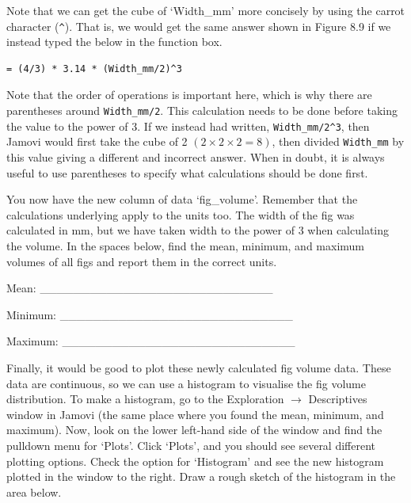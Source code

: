 \documentclass[
]{scrbook}
\begin{document}
Note that we can get the cube of `Width\_mm' more concisely by using the carrot character (\texttt{\^{}}).
That is, we would get the same answer shown in Figure 8.9 if we instead typed the below in the function box.

\begin{verbatim}
= (4/3) * 3.14 * (Width_mm/2)^3
\end{verbatim}

Note that the order of operations is important here, which is why there are parentheses around \texttt{Width\_mm/2}. This calculation needs to be done before taking the value to the power of 3. If we instead had written, \texttt{Width\_mm/2\^{}3}, then Jamovi would first take the cube of 2 \((2 \times 2 \times 2 = 8)\), then divided \texttt{Width\_mm} by this value giving a different and incorrect answer. When in doubt, it is always useful to use parentheses to specify what calculations should be done first.

You now have the new column of data `fig\_volume'.
Remember that the calculations underlying apply to the units too.
The width of the fig was calculated in mm, but we have taken width to the power of 3 when calculating the volume.
In the spaces below, find the mean, minimum, and maximum volumes of all figs and report them in the correct units.

Mean: \_\_\_\_\_\_\_\_\_\_\_\_\_\_\_\_\_\_\_\_\_\_\_\_\_\_\_\_

Minimum: \_\_\_\_\_\_\_\_\_\_\_\_\_\_\_\_\_\_\_\_\_\_\_\_\_\_\_\_

Maximum: \_\_\_\_\_\_\_\_\_\_\_\_\_\_\_\_\_\_\_\_\_\_\_\_\_\_\_\_

Finally, it would be good to plot these newly calculated fig volume data.
These data are continuous, so we can use a histogram to visualise the fig volume distribution.
To make a histogram, go to the Exploration \(\to\) Descriptives window in Jamovi (the same place where you found the mean, minimum, and maximum).
Now, look on the lower left-hand side of the window and find the pulldown menu for `Plots'.
Click `Plots', and you should see several different plotting options.
Check the option for `Histogram' and see the new histogram plotted in the window to the right.
Draw a rough sketch of the histogram in the area below.

\begin{verbatim}






\end{verbatim}
\end{document}
